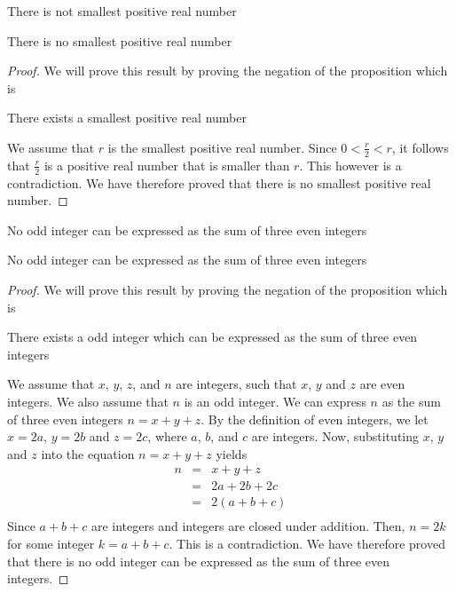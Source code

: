 \newpage
\begin{example}
There is not smallest positive real number
\begin{tcolorbox}
	\begin{theorem}
	\label{the2}		
		There is no smallest positive real number
	\end{theorem}
\end{tcolorbox}

\begin{proof}

We will prove this result by proving the negation of the proposition which is
	\begin{center}
		There exists a smallest positive real number
	\end{center}

We assume that $r$ is the smallest positive real number. Since $0 < \frac{r}{2} < r$, it follows that $\frac{r}{2}$ is a positive real number that is smaller than $r$. This however is a contradiction. We have therefore proved that there is no smallest positive real number. 

\end{proof}
\end{example}

\newpage
\begin{example}
No odd integer can be expressed as the sum of three even integers
\begin{tcolorbox}
	\begin{theorem}
	\label{the2}		
		No odd integer can be expressed as the sum of three even integers
	\end{theorem}
\end{tcolorbox}

\begin{proof}
    We will prove this result by proving the negation of the proposition which is
    	\begin{center}
    		There exists a odd integer which can be expressed as the sum of three even integers
    	\end{center}
    
    We assume that $x$, $y$, $z$, and $n$ are integers, such that $x$, $y$ and $z$ are even integers. We also assume that $n$ is an odd integer. We can express $n$ as the sum of three even integers $n = x + y + z$. By the definition of even integers, we let $x=2a$, $y=2b$ and $z=2c$, where $a$, $b$, and $c$ are integers. Now, substituting $x$, $y$ and $z$ into the equation $n = x + y + z$ yields
    		\begin{eqnarray*}
    			n & = & x + y + z \nonumber \\
    			& = & 2a + 2b + 2c \nonumber \\
    			& = & 2(a + b + c) \nonumber \\
    		\end{eqnarray*}
    Since $a + b + c$ are integers and integers are closed under addition. Then, $n=2k$ for some integer $k = a + b + c$. This is a contradiction. We have therefore proved that there is no odd integer can be expressed as the sum of three even integers.
\end{proof}
\end{example}


